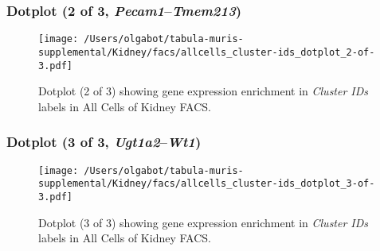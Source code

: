 \clearpage

\subsubsection{Dotplot (2 of 3, \emph{Pecam1}--\emph{Tmem213})}
\begin{figure}[h]
\centering
\texttt{[image: /Users/olgabot/tabula-muris-supplemental/Kidney/facs/allcells\_cluster-ids\_dotplot\_2-of-3.pdf]}

\caption{ Dotplot (2 of 3)  showing gene expression enrichment in \emph{Cluster IDs} labels in All Cells of Kidney FACS. }
\end{figure}


\clearpage

\subsubsection{Dotplot (3 of 3, \emph{Ugt1a2}--\emph{Wt1})}
\begin{figure}[h]
\centering
\texttt{[image: /Users/olgabot/tabula-muris-supplemental/Kidney/facs/allcells\_cluster-ids\_dotplot\_3-of-3.pdf]}

\caption{ Dotplot (3 of 3)  showing gene expression enrichment in \emph{Cluster IDs} labels in All Cells of Kidney FACS. }
\end{figure}

